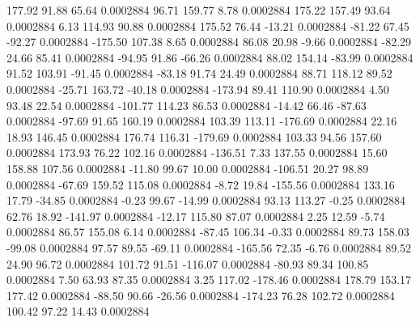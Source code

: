       177.92       91.88       65.64     0.0002884
       96.71      159.77        8.78     0.0002884
      175.22      157.49       93.64     0.0002884
        6.13      114.93       90.88     0.0002884
      175.52       76.44      -13.21     0.0002884
      -81.22       67.45      -92.27     0.0002884
     -175.50      107.38        8.65     0.0002884
       86.08       20.98       -9.66     0.0002884
      -82.29       24.66       85.41     0.0002884
      -94.95       91.86      -66.26     0.0002884
       88.02      154.14      -83.99     0.0002884
       91.52      103.91      -91.45     0.0002884
      -83.18       91.74       24.49     0.0002884
       88.71      118.12       89.52     0.0002884
      -25.71      163.72      -40.18     0.0002884
     -173.94       89.41      110.90     0.0002884
        4.50       93.48       22.54     0.0002884
     -101.77      114.23       86.53     0.0002884
      -14.42       66.46      -87.63     0.0002884
      -97.69       91.65      160.19     0.0002884
      103.39      113.11     -176.69     0.0002884
       22.16       18.93      146.45     0.0002884
      176.74      116.31     -179.69     0.0002884
      103.33       94.56      157.60     0.0002884
      173.93       76.22      102.16     0.0002884
     -136.51        7.33      137.55     0.0002884
       15.60      158.88      107.56     0.0002884
      -11.80       99.67       10.00     0.0002884
     -106.51       20.27       98.89     0.0002884
      -67.69      159.52      115.08     0.0002884
       -8.72       19.84     -155.56     0.0002884
      133.16       17.79      -34.85     0.0002884
       -0.23       99.67      -14.99     0.0002884
       93.13      113.27       -0.25     0.0002884
       62.76       18.92     -141.97     0.0002884
      -12.17      115.80       87.07     0.0002884
        2.25       12.59       -5.74     0.0002884
       86.57      155.08        6.14     0.0002884
      -87.45      106.34       -0.33     0.0002884
       89.73      158.03      -99.08     0.0002884
       97.57       89.55      -69.11     0.0002884
     -165.56       72.35       -6.76     0.0002884
       89.52       24.90       96.72     0.0002884
      101.72       91.51     -116.07     0.0002884
      -80.93       89.34      100.85     0.0002884
        7.50       63.93       87.35     0.0002884
        3.25      117.02     -178.46     0.0002884
      178.79      153.17      177.42     0.0002884
      -88.50       90.66      -26.56     0.0002884
     -174.23       76.28      102.72     0.0002884
      100.42       97.22       14.43     0.0002884
